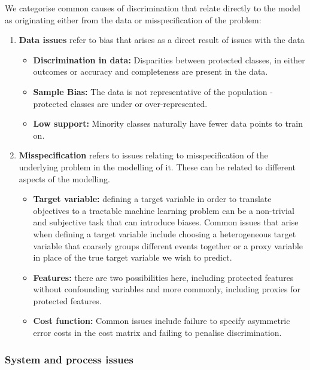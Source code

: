 We categorise common causes of discrimination that relate directly to the model as originating either from the data or misspecification of the problem:
\begin{enumerate}[leftmargin=*]
%
\item \textbf{Data issues} refer to bias that arises as a direct result of issues with the data
%
\begin{itemize}[leftmargin=*]
%
\item \textbf{Discrimination in data:} Disparities between protected classes, in either outcomes or accuracy and completeness are present in the data.
%
\item \textbf{Sample Bias:} The data is not representative of the population - protected classes are under or over-represented.
%
\item \textbf{Low support:} Minority classes naturally have fewer data points to train on.
\end{itemize}
%
\item \textbf{Misspecification} refers to issues relating to misspecification of the underlying problem in the modelling of it. These can be related to different aspects of the modelling.
%
\begin{itemize}[leftmargin=*]
%
\item \textbf{Target variable:} defining a target variable in order to translate objectives to a tractable machine learning problem can be a non-trivial and subjective task that can introduce biases. Common issues that arise when defining a target variable include choosing a heterogeneous target variable that coarsely groups different events together or a proxy variable in place of the true target variable we wish to predict.
%
\item \textbf{Features:} there are two possibilities here, including protected features without confounding variables and more commonly, including proxies for protected features.
%
\item \textbf{Cost function:} Common issues include failure to specify asymmetric error costs in the cost matrix and failing to penalise discrimination.
\end{itemize}
%
\end{enumerate}

\subsubsection*{System and process issues}


